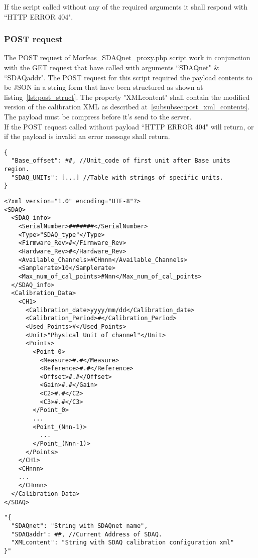 If the script called without any of the required arguments it shall respond with ``HTTP ERROR 404".

\subsubsection{POST request}
The POST request of Morfeas\_SDAQnet\_proxy.php script work in conjunction with the GET request that have called with arguments ``SDAQnet" \& ``SDAQaddr".
The POST request for this script required the payload contents to be JSON in a string form that have been structured as shown at listing~\ref{lst:post_struct}.
The property "XMLcontent" shall contain the modified version of the calibration XML as described at~\ref{subsubsec:post_xml_contents}.
The payload must be compress before it's send to the server.\\
If the POST request called without payload ``HTTP ERROR 404" will return, or if the payload is invalid an error message shall return.
\newpage
\begin{lstlisting}[frame=single,caption=Return of call with argument ``UNITs",label=lst:SDAQ_units]
{
  "Base_offset": ##, //Unit_code of first unit after Base units region.
  "SDAQ_UNITs": [...] //Table with strings of specific units.
}
\end{lstlisting}
\begin{lstlisting}[frame=single,caption=Return of call with arguments ``SDAQnet"\&``SDAQaddr",label=lst:SDAQ_calib_info]
<?xml version="1.0" encoding="UTF-8"?>
<SDAQ>
  <SDAQ_info>
    <SerialNumber>#######</SerialNumber>
    <Type>"SDAQ_type"</Type>
    <Firmware_Rev>#</Firmware_Rev>
    <Hardware_Rev>#</Hardware_Rev>
    <Available_Channels>#CHnnn</Available_Channels>
    <Samplerate>10</Samplerate>
    <Max_num_of_cal_points>#Nnn</Max_num_of_cal_points>
  </SDAQ_info>
  <Calibration_Data>
    <CH1>
      <Calibration_date>yyyy/mm/dd</Calibration_date>
      <Calibration_Period>#</Calibration_Period>
      <Used_Points>#</Used_Points>
      <Unit>"Physical Unit of channel"</Unit>
      <Points>
        <Point_0>
          <Measure>#.#</Measure>
          <Reference>#.#</Reference>
          <Offset>#.#</Offset>
          <Gain>#.#</Gain>
          <C2>#.#</C2>
          <C3>#.#</C3>
        </Point_0>
        ...
        <Point_(Nnn-1)>
          ...
        </Point_(Nnn-1)>
      </Points>
    </CH1>
    <CHnnn>
    ...
    </CHnnn>
  </Calibration_Data>
</SDAQ>
\end{lstlisting}
\begin{lstlisting}[frame=single,caption=Structure of Data for Post request",label=lst:post_struct]
"{
  "SDAQnet": "String with SDAQnet name",
  "SDAQaddr": ##, //Current Address of SDAQ.
  "XMLcontent": "String with SDAQ calibration configuration xml"
}"
\end{lstlisting}
\newpage
